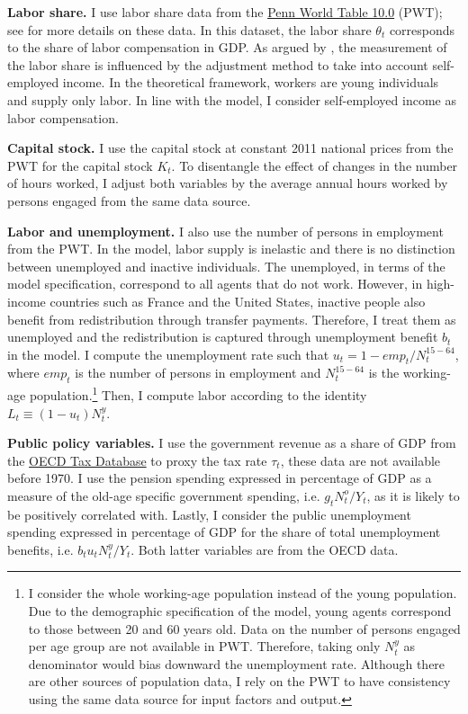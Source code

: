 \textbf{Labor share.} I use labor share data from the \href{https://www.rug.nl/ggdc/productivity/pwt/}{Penn World Table 10.0} (PWT); see \citet{Feenstra2015Next} for more details on these data. In this dataset, the labor share $\theta_t$ corresponds to the share of labor compensation in GDP. As argued by \citet{Gollin2002Getting}, the measurement of the labor share is influenced by the adjustment method to take into account self-employed income. In the theoretical framework, workers are young individuals and supply only labor. In line with the model, I consider self-employed income as labor compensation.

\textbf{Capital stock.} I use the capital stock at constant 2011 national prices from the PWT for the capital stock $K_t$. To disentangle the effect of changes in the number of hours worked, I adjust both variables by the average annual hours worked by persons engaged from the same data source.

\textbf{Labor and unemployment.} I also use the number of persons in employment from the PWT. In the model, labor supply is inelastic and there is no distinction between unemployed and inactive individuals. The unemployed, in terms of the model specification, correspond to all agents that do not work. However, in high-income countries such as France and the United States, inactive people also benefit from redistribution through transfer payments. Therefore, I treat them as unemployed and the redistribution is captured through unemployment benefit $b_t$ in the model. I compute the unemployment rate such that $u_t = 1 - emp_t/N^{15-64}_t$, where $emp_t$ is the number of persons in employment and $N_t^{15-64}$ is the working-age population.\footnote{I consider the whole working-age population instead of the young population. Due to the demographic specification of the model, young agents correspond to those between 20 and 60 years old. Data on the number of persons engaged per age group are not available in PWT. Therefore, taking only $N^y_t$ as denominator would bias downward the unemployment rate. %
Although there are other sources of population data, I rely on the PWT to have consistency using the same data source for input factors and output.}
Then, I compute labor according to the identity $L_t\equiv(1-u_t)N_t^y$.

\textbf{Public policy variables.} I use the government revenue as a share of GDP from the \href{https://www.oecd.org/tax/tax-policy/tax-database/}{OECD Tax Database} to proxy the tax rate $\tau_t$, these data are not available before 1970. I use the pension spending expressed in percentage of GDP as a measure of the old-age specific government spending, i.e. $g_tN^o_t/Y_t$, as it is likely to be positively correlated with. Lastly, I consider the public unemployment spending expressed in percentage of GDP for the share of total unemployment benefits, i.e. $b_tu_tN^y_t/Y_t$. Both latter variables are from the OECD data.

